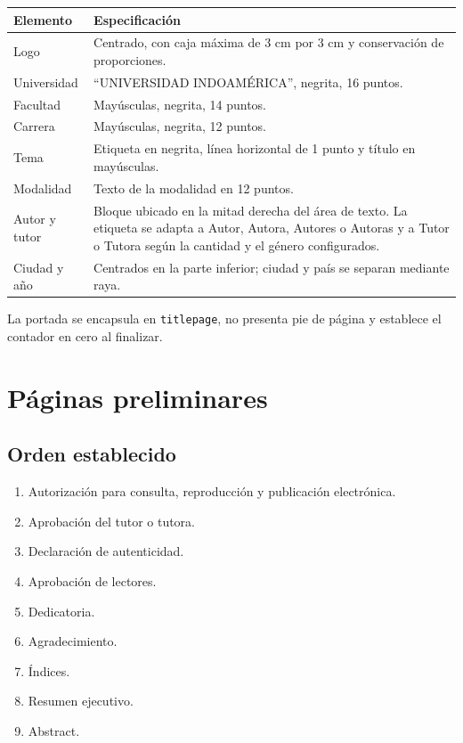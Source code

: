 \documentclass[12pt,a4paper,oneside]{report}
\begin{document}
\begin{longtable}{|p{4.2cm}|p{8.4cm}|}
  \hline
  \textbf{Elemento} & \textbf{Especificación} \\
  \hline
  Logo & Centrado, con caja máxima de 3 cm por 3 cm y conservación de proporciones. \\
  \hline
  Universidad & ``UNIVERSIDAD INDOAMÉRICA'', negrita, 16 puntos. \\
  \hline
  Facultad & Mayúsculas, negrita, 14 puntos. \\
  \hline
  Carrera & Mayúsculas, negrita, 12 puntos. \\
  \hline
  Tema & Etiqueta en negrita, línea horizontal de 1 punto y título en mayúsculas. \\
  \hline
  Modalidad & Texto de la modalidad en 12 puntos. \\
  \hline
  Autor y tutor & Bloque ubicado en la mitad derecha del área de texto. La etiqueta se adapta a Autor, Autora, Autores o Autoras y a Tutor o Tutora según la cantidad y el género configurados. \\
  \hline
  Ciudad y año & Centrados en la parte inferior; ciudad y país se separan mediante raya. \\
  \hline
\end{longtable}

La portada se encapsula en \texttt{titlepage}, no presenta pie de página y establece el contador en cero al finalizar.

\chapter{Páginas preliminares}

\section{Orden establecido}

\begin{enumerate}
  \item Autorización para consulta, reproducción y publicación electrónica.
  \item Aprobación del tutor o tutora.
  \item Declaración de autenticidad.
  \item Aprobación de lectores.
  \item Dedicatoria.
  \item Agradecimiento.
  \item Índices.
  \item Resumen ejecutivo.
  \item Abstract.
\end{enumerate}
\end{document}
